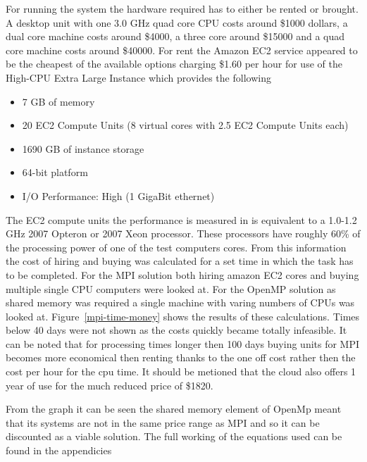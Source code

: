 For running the system the hardware required has to either be rented or brought. A desktop unit with  one 3.0 GHz quad core CPU costs around \$1000 dollars, a dual core machine costs around \$4000, a three core around \$15000 and a quad core machine costs around \$40000. For rent the Amazon EC2 service appeared to be the cheapest of the available options charging \$1.60 per hour for use of the High-CPU Extra Large Instance which provides the following 

\begin{itemize}
\item 7 GB of memory
\item 20 EC2 Compute Units (8 virtual cores with 2.5 EC2 Compute Units each)
\item 1690 GB of instance storage
\item 64-bit platform
\item I/O Performance: High (1 GigaBit ethernet)
\end{itemize}

The EC2 compute units the performance is measured in is equivalent to a 1.0-1.2 GHz 2007 Opteron or 2007 Xeon processor. These processors have roughly 60\% of the processing power of one of the test computers cores. From this information the cost of hiring and buying was calculated for a set time in which the task has to be completed. For the MPI solution both hiring amazon EC2 cores and buying multiple single CPU computers were looked at. For the OpenMP solution as shared memory was required a single machine with varing numbers of CPUs was looked at. Figure~\ref{mpi-time-money} shows the results of these calculations. Times below 40 days were not shown as the costs quickly became totally infeasible. It can be noted that for processing times longer then 100 days buying units for MPI becomes more economical then renting thanks to the one off cost rather then the cost per hour for the cpu time. It should be metioned that the cloud also offers 1 year of use for the much reduced price of \$1820.

From the graph it can be seen the shared memory element of OpenMp meant that its systems are not in the same price range as MPI and so it can be discounted as a viable solution. The full working of the equations used can be found in the appendicies


